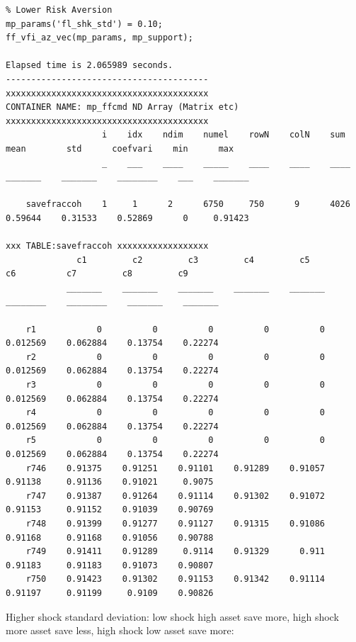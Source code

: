 \documentclass[
]{book}
\begin{document}
\begin{verbatim}
% Lower Risk Aversion
mp_params('fl_shk_std') = 0.10;
ff_vfi_az_vec(mp_params, mp_support);

Elapsed time is 2.065989 seconds.
----------------------------------------
xxxxxxxxxxxxxxxxxxxxxxxxxxxxxxxxxxxxxxxx
CONTAINER NAME: mp_ffcmd ND Array (Matrix etc)
xxxxxxxxxxxxxxxxxxxxxxxxxxxxxxxxxxxxxxxx
                   i    idx    ndim    numel    rowN    colN    sum      mean        std      coefvari    min      max  
                   _    ___    ____    _____    ____    ____    ____    _______    _______    ________    ___    _______

    savefraccoh    1     1      2      6750     750      9      4026    0.59644    0.31533    0.52869      0     0.91423

xxx TABLE:savefraccoh xxxxxxxxxxxxxxxxxx
              c1         c2         c3         c4         c5          c6          c7         c8         c9   
            _______    _______    _______    _______    _______    ________    ________    _______    _______

    r1            0          0          0          0          0    0.012569    0.062884    0.13754    0.22274
    r2            0          0          0          0          0    0.012569    0.062884    0.13754    0.22274
    r3            0          0          0          0          0    0.012569    0.062884    0.13754    0.22274
    r4            0          0          0          0          0    0.012569    0.062884    0.13754    0.22274
    r5            0          0          0          0          0    0.012569    0.062884    0.13754    0.22274
    r746    0.91375    0.91251    0.91101    0.91289    0.91057     0.91138     0.91136    0.91021     0.9075
    r747    0.91387    0.91264    0.91114    0.91302    0.91072     0.91153     0.91152    0.91039    0.90769
    r748    0.91399    0.91277    0.91127    0.91315    0.91086     0.91168     0.91168    0.91056    0.90788
    r749    0.91411    0.91289     0.9114    0.91329      0.911     0.91183     0.91183    0.91073    0.90807
    r750    0.91423    0.91302    0.91153    0.91342    0.91114     0.91197     0.91199     0.9109    0.90826
\end{verbatim}

Higher shock standard deviation: low shock high asset save more, high
shock more asset save less, high shock low asset save more:
\end{document}
